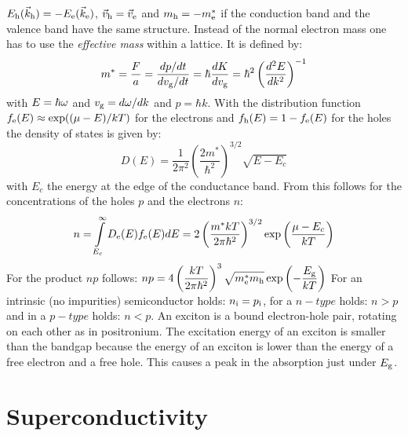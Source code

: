\documentclass[a4paper]{report}
\begin{document}
$E_{\rm h}(\vec{k}_{\rm h})=-E_{\rm e}(\vec{k}_{\rm e})$,
$\vec{v}_{\rm h}=\vec{v}_{\rm e}$ and $m_{\rm h}=-m_{\rm e}^*$ if the conduction band
and the valence band have the same structure.
\npar
Instead of the normal electron mass one has to use the {\it effective mass}
within a lattice. It is defined by:
\[
m^*=\frac{F}{a}=\frac{dp/dt}{dv_{\rm g}/dt}=\hbar\frac{dK}{dv_{\rm g}}=
\hbar^2\left(\frac{d^2E}{dk^2}\right)^{-1}
\]
with $E=\hbar\omega$ and $v_{\rm g}=d\omega/dk$ and $p=\hbar k$.
\npar
With the distribution function $f_{\rm e}(E)\approx\exp((\mu-E)/kT)$ for the
electrons and $f_{\rm h}(E)=1-f_{\rm e}(E)$ for the holes the density of
states is given by:
\[
D(E)=\frac{1}{2\pi^2}\left(\frac{2m^*}{\hbar^2}\right)^{3/2}\sqrt{E-E_c}
\]
with $E_c$ the energy at the edge of the conductance band. From this follows
for the concentrations of the holes $p$ and the electrons $n$:
\[
n=\int\limits_{E_c}^{\infty}D_{\rm e}(E)f_{\rm e}(E)dE=2\left(\frac{m^*kT}{2\pi\hbar^2}
\right)^{3/2}\exp\left(\frac{\mu-E_c}{kT}\right)
\]
For the product $np$ follows:
$\displaystyle np=4\left(\frac{kT}{2\pi\hbar^2}\right)^3
\sqrt{m^*_{\rm e}m_{\rm h}}\exp\left(-\frac{E_{\rm g}}{kT}\right)$
\npar
For an intrinsic (no impurities) semiconductor holds: $n_{\rm i}=p_{\rm i}$,
for a $n-type$ holds: $n>p$ and in a $p-type$ holds: $n<p$.
\npar
An exciton is a bound electron-hole pair, rotating on each other as in
positronium. The excitation energy of an exciton is smaller than the bandgap
because the energy of an exciton is lower than the energy of a free electron
and a free hole. This causes a peak in the absorption just under $E_{\rm g}$.

\section{Superconductivity}
\end{document}
